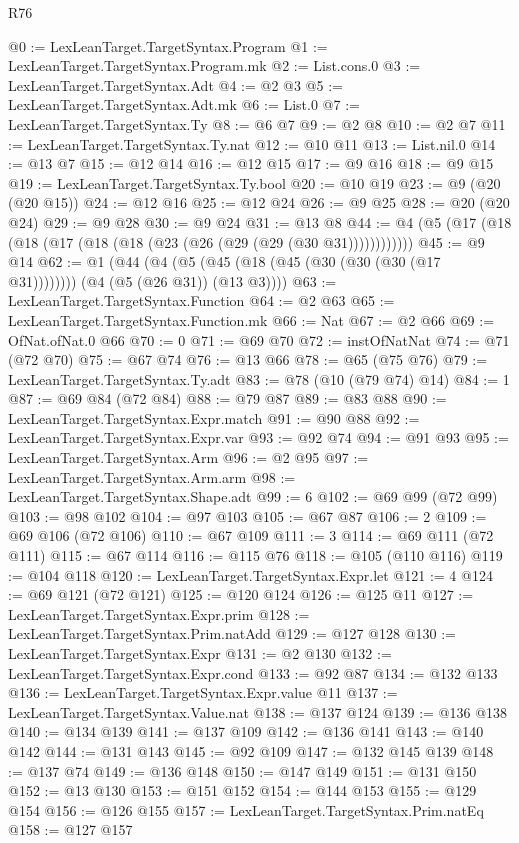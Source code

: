 \begin{lexlean}{R76}
\begin{coremodule}
@0 := LexLeanTarget.TargetSyntax.Program
@1 := LexLeanTarget.TargetSyntax.Program.mk
@2 := List.cons.{0}
@3 := LexLeanTarget.TargetSyntax.Adt
@4 := @2 @3
@5 := LexLeanTarget.TargetSyntax.Adt.mk
@6 := List.{0}
@7 := LexLeanTarget.TargetSyntax.Ty
@8 := @6 @7
@9 := @2 @8
@10 := @2 @7
@11 := LexLeanTarget.TargetSyntax.Ty.nat
@12 := @10 @11
@13 := List.nil.{0}
@14 := @13 @7
@15 := @12 @14
@16 := @12 @15
@17 := @9 @16
@18 := @9 @15
@19 := LexLeanTarget.TargetSyntax.Ty.bool
@20 := @10 @19
@23 := @9 (@20 (@20 @15))
@24 := @12 @16
@25 := @12 @24
@26 := @9 @25
@28 := @20 (@20 @24)
@29 := @9 @28
@30 := @9 @24
@31 := @13 @8
@44 := @4 (@5 (@17 (@18 (@18 (@17 (@18 (@18 (@23 (@26 (@29 (@29 (@30 @31))))))))))))
@45 := @9 @14
@62 := @1 (@44 (@4 (@5 (@45 (@18 (@45 (@30 (@30 (@30 (@17 @31)))))))) (@4 (@5 (@26 @31)) (@13 @3))))
@63 := LexLeanTarget.TargetSyntax.Function
@64 := @2 @63
@65 := LexLeanTarget.TargetSyntax.Function.mk
@66 := Nat
@67 := @2 @66
@69 := OfNat.ofNat.{0} @66
@70 := 0
@71 := @69 @70
@72 := instOfNatNat
@74 := @71 (@72 @70)
@75 := @67 @74
@76 := @13 @66
@78 := @65 (@75 @76)
@79 := LexLeanTarget.TargetSyntax.Ty.adt
@83 := @78 (@10 (@79 @74) @14)
@84 := 1
@87 := @69 @84 (@72 @84)
@88 := @79 @87
@89 := @83 @88
@90 := LexLeanTarget.TargetSyntax.Expr.match
@91 := @90 @88
@92 := LexLeanTarget.TargetSyntax.Expr.var
@93 := @92 @74
@94 := @91 @93
@95 := LexLeanTarget.TargetSyntax.Arm
@96 := @2 @95
@97 := LexLeanTarget.TargetSyntax.Arm.arm
@98 := LexLeanTarget.TargetSyntax.Shape.adt
@99 := 6
@102 := @69 @99 (@72 @99)
@103 := @98 @102
@104 := @97 @103
@105 := @67 @87
@106 := 2
@109 := @69 @106 (@72 @106)
@110 := @67 @109
@111 := 3
@114 := @69 @111 (@72 @111)
@115 := @67 @114
@116 := @115 @76
@118 := @105 (@110 @116)
@119 := @104 @118
@120 := LexLeanTarget.TargetSyntax.Expr.let
@121 := 4
@124 := @69 @121 (@72 @121)
@125 := @120 @124
@126 := @125 @11
@127 := LexLeanTarget.TargetSyntax.Expr.prim
@128 := LexLeanTarget.TargetSyntax.Prim.natAdd
@129 := @127 @128
@130 := LexLeanTarget.TargetSyntax.Expr
@131 := @2 @130
@132 := LexLeanTarget.TargetSyntax.Expr.cond
@133 := @92 @87
@134 := @132 @133
@136 := LexLeanTarget.TargetSyntax.Expr.value @11
@137 := LexLeanTarget.TargetSyntax.Value.nat
@138 := @137 @124
@139 := @136 @138
@140 := @134 @139
@141 := @137 @109
@142 := @136 @141
@143 := @140 @142
@144 := @131 @143
@145 := @92 @109
@147 := @132 @145 @139
@148 := @137 @74
@149 := @136 @148
@150 := @147 @149
@151 := @131 @150
@152 := @13 @130
@153 := @151 @152
@154 := @144 @153
@155 := @129 @154
@156 := @126 @155
@157 := LexLeanTarget.TargetSyntax.Prim.natEq
@158 := @127 @157

\end{coremodule}
\end{lexlean}
